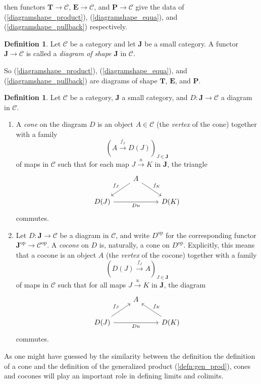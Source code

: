 \documentclass[10pt,oneside]{book}
\def\~#1{\mathscr{#1}}
\def\To#1{\xrightarrow{#1}}
\newcommand{\op}{\mathrm{op}}
\theoremstyle{plain}
\theoremstyle{definition}
\newtheorem{defn}[thm]{Definition}
\theoremstyle{remark}
\numberwithin{equation}{section}
\numberwithin{figure}{section}
\begin{document}
then functors $\mathbf{T} \to \~C$, $\mathbf{E} \to \~C$, and $\mathbf{P} \to \~C$ give the data of (\ref{diagramshape_product}), (\ref{diagramshape_equa}), and (\ref{diagramshape_pullback}) respectively. 
\begin{defn}
Let $\~C$ be a category and let $\mathbf{J}$ be a small category. A functor $\mathbf{J} \to \~C$ is called a \emph{diagram of shape $\mathbf{J}$} in $\~C$. 
\end{defn} 
So (\ref{diagramshape_product}), (\ref{diagramshape_equa}), and (\ref{diagramshape_pullback}) are diagrams of shape $\mathbf{T}$, $\mathbf{E}$, and $\mathbf{P}$. 
\begin{defn}
Let $\~C$ be a category, $\mathbf{J}$ a small category, and $D: \mathbf{J} \to \~C$ a diagram in $\~C$.
\begin{enumerate}
\item A \emph{cone} on the diagram $D$ is an object $A \in \~C$ (the \emph{vertex} of the cone) together with a family
\begin{equation}
\label{cone}
\left(A \To{f_J} D(J) \right)_{J \in \mathbf{J}}
\end{equation}
of maps in $\~C$ such that for each map $J \To{u} K$ in  $\mathbf{J}$, the triangle
\[\begin{tikzcd}
    & A \\
    {D(J)} && {D(K)}
    \arrow["{f_J}"', from=1-2, to=2-1]
    \arrow["{f_K}", from=1-2, to=2-3]
    \arrow["Du"', from=2-1, to=2-3]
\end{tikzcd}\]
commutes. 
\item Let $D: \mathbf{J} \to \~C$ be a diagram in $\~C$, and write $D^\op$ for the corresponding functor $\mathbf{J}^\op \to \~C^\op$. A \emph{cocone} on $D$ is, naturally, a cone on $D^\op$. Explicitly, this means that a cocone is an object $A$ (the \emph{vertex} of the cocone) together with a family
\begin{equation}
\label{cocone}
\left(D(J) \To{f_J} A \right)_{J \in \mathbf{J}}
\end{equation}
of maps in $\~C$ such that for all maps $J \To{u} K$ in $\mathbf{J}$, the diagram
\[\begin{tikzcd}
    & A \\
    {D(J)} && {D(K)}
    \arrow["{f_J}", from=2-1, to=1-2]
    \arrow["{f_K}"', from=2-3, to=1-2]
    \arrow["Du"', from=2-1, to=2-3]
\end{tikzcd}\]
commutes.
\end{enumerate}
\end{defn}
As one might have guessed by the similarity between the definition the definition of a cone and the definition of the generalized product (\ref{defn:gen_prod}), cones and cocones will play an important role in defining limits and colimits.
\end{document}

